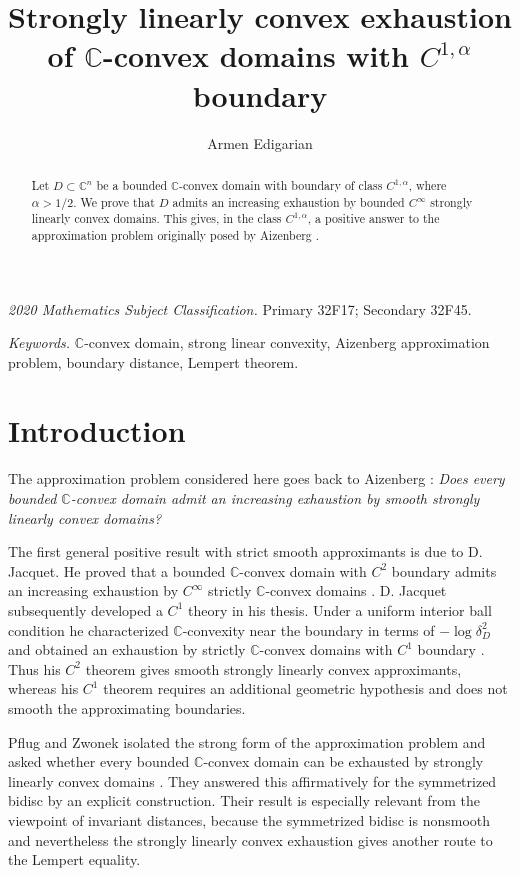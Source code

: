 \documentclass[12pt]{amsart}
\title{Strongly linearly convex exhaustion of $\mathbb C$-convex domains with $C^{1,\alpha}$ boundary}
\author{Armen Edigarian}
\newcommand{\C}{\mathbb C}
\begin{document}
\maketitle

\begin{abstract}
Let $D\subset\C^n$ be a bounded $\mathbb C$-convex domain with boundary of class $C^{1,\alpha}$, where $\alpha>1/2$. We prove that $D$ admits an increasing exhaustion by bounded $C^\infty$ strongly linearly convex domains. This gives, in the class $C^{1,\alpha}$, a positive answer to the approximation problem originally posed by Aizenberg \cite{Aiz94}.
\end{abstract}

\medskip
\noindent\textit{2020 Mathematics Subject Classification.} Primary 32F17; Secondary 32F45.

\noindent\textit{Keywords.} $\mathbb C$-convex domain, strong linear convexity, Aizenberg approximation problem, boundary distance, Lempert theorem.

\section{Introduction}

The approximation problem considered here goes back to Aizenberg \cite{Aiz94}:
\medskip
\noindent\emph{Does every bounded $\C$-convex domain admit an increasing exhaustion by smooth strongly linearly convex domains?}
\medskip

The first general positive result with strict smooth approximants is due to D. Jacquet. He proved that a bounded $\C$-convex domain with $C^2$ boundary admits an increasing exhaustion by $C^\infty$ strictly $\C$-convex domains \cite{Jac06}. D. Jacquet subsequently developed a $C^1$ theory in his thesis. Under a uniform interior ball condition he characterized $\C$-convexity near the boundary in terms of $-\log\delta_D^2$ and obtained an exhaustion by strictly $\C$-convex domains with $C^1$ boundary \cite[Theorems~3.2.2 and~3.2.4]{Jac08}. Thus his $C^2$ theorem gives smooth strongly linearly convex approximants, whereas his $C^1$ theorem requires an additional geometric hypothesis and does not smooth the approximating boundaries.

Pflug and Zwonek isolated the strong form of the approximation problem and asked whether every bounded $\C$-convex domain can be exhausted by strongly linearly convex domains \cite{PZ12}. They answered this affirmatively for the symmetrized bidisc by an explicit construction. Their result is especially relevant from the viewpoint of invariant distances, because the symmetrized bidisc is nonsmooth and nevertheless the strongly linearly convex exhaustion gives another route to the Lempert equality.
\end{document}
